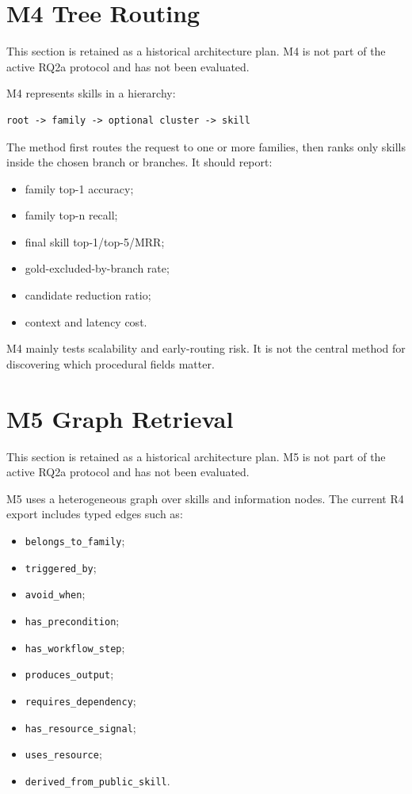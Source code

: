 \section{M4 Tree Routing}

This section is retained as a historical architecture plan. M4 is not part of the active RQ2a protocol and has not been evaluated.

M4 represents skills in a hierarchy:

\begin{verbatim}
root -> family -> optional cluster -> skill
\end{verbatim}

The method first routes the request to one or more families, then ranks only skills inside the chosen branch or branches. It should report:

\begin{itemize}
  \item family top-1 accuracy;
  \item family top-n recall;
  \item final skill top-1/top-5/MRR;
  \item gold-excluded-by-branch rate;
  \item candidate reduction ratio;
  \item context and latency cost.
\end{itemize}

M4 mainly tests scalability and early-routing risk. It is not the central method for discovering which procedural fields matter.

\section{M5 Graph Retrieval}

This section is retained as a historical architecture plan. M5 is not part of the active RQ2a protocol and has not been evaluated.

M5 uses a heterogeneous graph over skills and information nodes. The current R4 export includes typed edges such as:

\begin{itemize}
  \item \texttt{belongs\_to\_family};
  \item \texttt{triggered\_by};
  \item \texttt{avoid\_when};
  \item \texttt{has\_precondition};
  \item \texttt{has\_workflow\_step};
  \item \texttt{produces\_output};
  \item \texttt{requires\_dependency};
  \item \texttt{has\_resource\_signal};
  \item \texttt{uses\_resource};
  \item \texttt{derived\_from\_public\_skill}.
\end{itemize}

